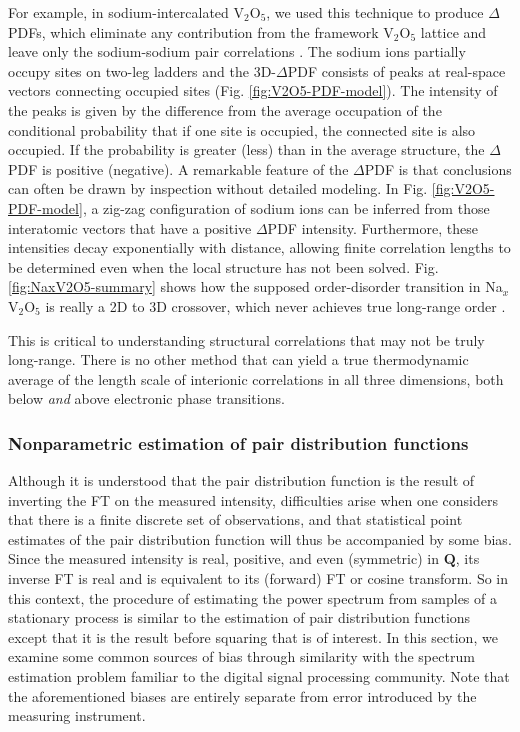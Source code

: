 For example, in sodium-intercalated V$_2$O$_5$, we used this technique to produce
$\Delta$PDFs, which eliminate any contribution from the framework V$_2$O$_5$ lattice
and leave only the sodium-sodium pair correlations \cite{Krogstad:2019tc}. The sodium
ions partially occupy sites on two-leg ladders and the 3D-$\Delta$PDF consists of
peaks at real-space vectors connecting occupied sites (Fig.
\ref{fig:V2O5-PDF-model}). The intensity of the peaks is given by the difference from
the average occupation of the conditional probability that if one site is occupied,
the connected site is also occupied. If the probability is greater (less) than in the
average structure, the $\Delta$PDF is positive (negative).  A remarkable feature of
the $\Delta$PDF is that conclusions can often be drawn by inspection without detailed
modeling. In Fig. \ref{fig:V2O5-PDF-model}, a zig-zag configuration of sodium ions
can be inferred from those interatomic vectors that have a positive $\Delta$PDF
intensity. Furthermore, these intensities decay exponentially with distance, allowing
finite correlation lengths to be determined even when the local structure has not
been solved. Fig. \ref{fig:NaxV2O5-summary} shows how the supposed order-disorder
transition in Na$_x$V$_2$O$_5$ is really a 2D to 3D crossover, which never achieves
true long-range order \cite{Krogstad:2019tc}. 

This is critical to understanding structural correlations that may not be truly
long-range. There is no other method that can yield a true thermodynamic average of
the length scale of interionic correlations in all three dimensions, both below
\textit{and} above electronic phase transitions. 

\subsubsection{Nonparametric estimation of pair distribution functions} Although it
is understood that the pair distribution function is the result of inverting the FT
on the measured intensity, difficulties arise when one considers that there is a
finite discrete set of observations, and that statistical point estimates of the pair
distribution function will thus be accompanied by some bias. Since the measured
intensity is real, positive, and even (symmetric) in $\mathbf{Q}$, its inverse FT is
real and is equivalent to its (forward) FT or cosine transform. So in this context,
the procedure of estimating the power spectrum from samples of a stationary process
is similar to the estimation of pair distribution functions except that it is the
result before squaring that is of interest. In this section, we examine some common
sources of bias through similarity with the spectrum estimation problem familiar to
the digital signal processing community. Note that the aforementioned biases are
entirely separate from error introduced by the measuring instrument.

